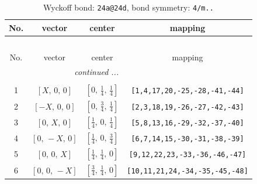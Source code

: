 \documentclass[fleqn,8pt]{jsarticle}
\begin{document}
\begin{longtable}{cccc}
\caption{Wyckoff bond: {\tt 24a@24d}, bond symmetry: {\tt 4/m..}}
 \\
 \hline \hline
No. & vector & center & mapping \\ \hline \endfirsthead

\multicolumn{3}{l}{\tablename\ \thetable{}} \\
 \hline \hline
No. & vector & center & mapping \\ \hline \endhead

 \hline \hline
\multicolumn{3}{r}{\footnotesize\it continued ...} \\ \endfoot

 \hline \hline
\multicolumn{3}{r}{} \\ \endlastfoot

1 & $\left[ X,\, 0,\, 0 \right]$ & $\left[ 0,\, \frac{1}{4},\, \frac{1}{4} \right]$ & {\tt [1,4,17,20,-25,-28,-41,-44]} \\ \hline
2 & $\left[ - X,\, 0,\, 0 \right]$ & $\left[ 0,\, \frac{3}{4},\, \frac{1}{4} \right]$ & {\tt [2,3,18,19,-26,-27,-42,-43]} \\ \hline
3 & $\left[ 0,\, X,\, 0 \right]$ & $\left[ \frac{1}{4},\, 0,\, \frac{1}{4} \right]$ & {\tt [5,8,13,16,-29,-32,-37,-40]} \\ \hline
4 & $\left[ 0,\, - X,\, 0 \right]$ & $\left[ \frac{1}{4},\, 0,\, \frac{3}{4} \right]$ & {\tt [6,7,14,15,-30,-31,-38,-39]} \\ \hline
5 & $\left[ 0,\, 0,\, X \right]$ & $\left[ \frac{1}{4},\, \frac{1}{4},\, 0 \right]$ & {\tt [9,12,22,23,-33,-36,-46,-47]} \\ \hline
6 & $\left[ 0,\, 0,\, - X \right]$ & $\left[ \frac{3}{4},\, \frac{1}{4},\, 0 \right]$ & {\tt [10,11,21,24,-34,-35,-45,-48]} \\
\end{longtable}
\renewcommand{\arraystretch}{1.2}
\end{document}
